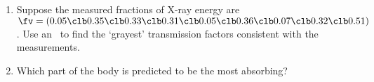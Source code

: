 \begin{exercise}
\begin{enumerate}
\item Suppose the measured fractions of X-ray energy are \(\fv=(0.05\clb 0.35\clb 0.33\clb 0.31\clb 0.05\clb 0.36\clb 0.07\clb 0.32\clb 0.51)\).
\setbox\ajrqrbox\hbox{}%
\marginpar{\usebox{\ajrqrbox\\[2ex]}}%
Use an \svd\ to find the `grayest' transmission factors consistent with the measurements.

\item Which part of the body is predicted to be the most absorbing?

\end{enumerate}
\end{exercise}




